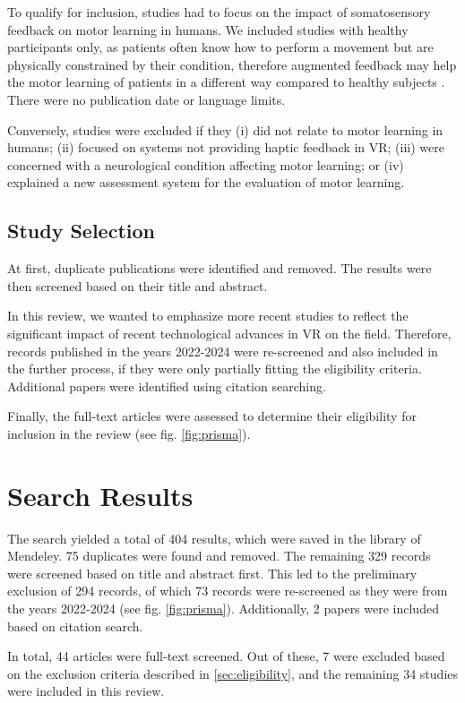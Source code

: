 To qualify for inclusion, studies had to focus on the impact of somatosensory feedback on motor learning in humans. We included studies with healthy participants only, as patients often know how to perform a movement but are physically constrained by their condition, therefore augmented feedback may help the motor learning of patients in a different way compared to healthy subjects \cite{Sigrist2013AugmentedReview}. There were no publication date or language limits.

Conversely, studies were excluded if they (i) did not relate to motor learning in humans; (ii) focused on systems not providing haptic feedback in VR; (iii) were concerned with a neurological condition affecting motor learning; or (iv) explained a new assessment system for the evaluation of motor learning.

\subsection{Study Selection}
At first, duplicate publications were identified and removed. The results were then screened based on their title and abstract. 

In this review, we wanted to emphasize more recent studies to reflect the significant impact of recent technological advances in VR on the field. Therefore, records published in the years 2022-2024 were re-screened and also included in the further process, if they were only partially fitting the eligibility criteria. Additional papers were identified using citation searching.

Finally, the full-text articles were assessed to determine their eligibility for inclusion in the review (see fig. \ref{fig:prisma}).


\section{Search Results}


The search yielded a total of 404 results, which were saved in the library of Mendeley. 75 duplicates were found and removed. The remaining 329 records were screened based on title and abstract first. This led to the preliminary exclusion of 294 records, of which 73 records were re-screened as they were from the years 2022-2024 (see fig. \ref{fig:prisma}). 
Additionally, 2 papers were included based on citation search. 

In total, 44 articles were full-text screened. Out of these, 7 were excluded based on the exclusion criteria described in \ref{sec:eligibility}, and the remaining 34 studies were included in this review.


